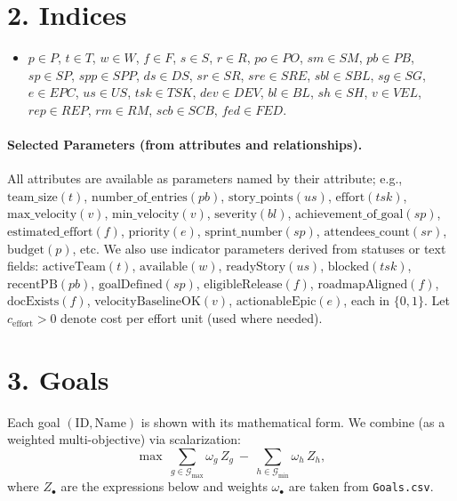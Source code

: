 \documentclass[11pt,a4paper]{article}
\begin{document}
\section{2. Indices}
\begin{itemize}[leftmargin=2em,label=\(\triangleright\)]
  \item \(p \in P\), \(t \in T\), \(w \in W\), \(f \in F\), \(s \in S\), \(r \in R\), \(po \in PO\), \(sm \in SM\), \(pb \in PB\),
  \(sp \in SP\), \(spp \in SPP\), \(ds \in DS\), \(sr \in SR\), \(sre \in SRE\), \(sbl \in SBL\), \(sg \in SG\), \(e \in EPC\),
  \(us \in US\), \(tsk \in TSK\), \(dev \in DEV\), \(bl \in BL\), \(sh \in SH\), \(v \in VEL\), \(rep \in REP\), \(rm \in RM\),
  \(scb \in SCB\), \(fed \in FED\).
\end{itemize}

\paragraph{Selected Parameters (from attributes and relationships).}
All attributes are available as parameters named by their attribute; e.g., \(\text{team\_size}(t)\), \(\text{number\_of\_entries}(pb)\), \(\text{story\_points}(us)\), \(\text{effort}(tsk)\), \(\text{max\_velocity}(v)\), \(\text{min\_velocity}(v)\), \(\text{severity}(bl)\), \(\text{achievement\_of\_goal}(sp)\), \(\text{estimated\_effort}(f)\), \(\text{priority}(e)\), \(\text{sprint\_number}(sp)\), \(\text{attendees\_count}(sr)\), \(\text{budget}(p)\), etc.
We also use indicator parameters derived from statuses or text fields:
\(\text{activeTeam}(t)\), \(\text{available}(w)\), \(\text{readyStory}(us)\),
\(\text{blocked}(tsk)\), \(\text{recentPB}(pb)\), \(\text{goalDefined}(sp)\),
\(\text{eligibleRelease}(f)\), \(\text{roadmapAligned}(f)\), \(\text{docExists}(f)\),
\(\text{velocityBaselineOK}(v)\), \(\text{actionableEpic}(e)\),
each in \(\{0,1\}\).
Let \(c_{\text{effort}}\!>\!0\) denote cost per effort unit (used where needed).

\section{3. Goals}
Each goal \((\text{ID}, \text{Name})\) is shown with its mathematical form. We combine (as a weighted multi-objective) via scalarization:
\[
\max \ \sum_{g \in \mathcal{G}_{\max}} \omega_g \, Z_g \ - \ \sum_{h \in \mathcal{G}_{\min}} \omega_h \, Z_h,
\]
where \(Z_\bullet\) are the expressions below and weights \(\omega_\bullet\) are taken from \texttt{Goals.csv}.
\end{document}
